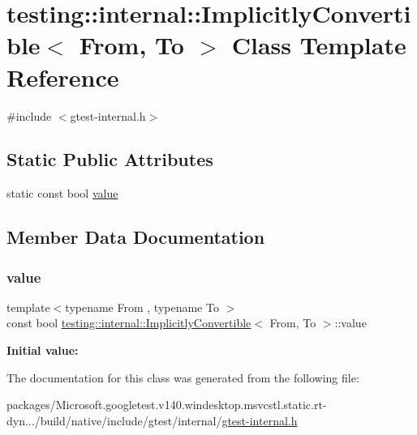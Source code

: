 \hypertarget{classtesting_1_1internal_1_1_implicitly_convertible}{}\section{testing\+::internal\+::Implicitly\+Convertible$<$ From, To $>$ Class Template Reference}
\label{classtesting_1_1internal_1_1_implicitly_convertible}


{\ttfamily \#include $<$gtest-\/internal.\+h$>$}

\subsection*{Static Public Attributes}
\begin{DoxyCompactItemize}
\item 
static const bool \mbox{\hyperlink{classtesting_1_1internal_1_1_implicitly_convertible_aea51cecabca681fb75659e224771b7b7}{value}}
\end{DoxyCompactItemize}


\subsection{Member Data Documentation}
\mbox{\label{classtesting_1_1internal_1_1_implicitly_convertible_aea51cecabca681fb75659e224771b7b7}} 
\subsubsection{\texorpdfstring{value}{value}}
{\footnotesize\ttfamily template$<$typename From , typename To $>$ \\
const bool \mbox{\hyperlink{classtesting_1_1internal_1_1_implicitly_convertible}{testing\+::internal\+::\+Implicitly\+Convertible}}$<$ From, To $>$\+::value\hspace{0.3cm}{\ttfamily [static]}}

{\bfseries Initial value\+:}
\begin{DoxyCode}{0}
\DoxyCodeLine{=}

\end{DoxyCode}


The documentation for this class was generated from the following file\+:\begin{DoxyCompactItemize}
\item 
packages/\+Microsoft.\+googletest.\+v140.\+windesktop.\+msvcstl.\+static.\+rt-\/dyn.../build/native/include/gtest/internal/\mbox{\hyperlink{gtest-internal_8h}{gtest-\/internal.\+h}}\end{DoxyCompactItemize}

